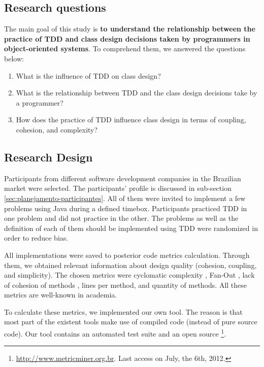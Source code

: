 \documentclass[conference]{IEEEtran}
\begin{document}
\subsection{Research questions}

The main goal of this study is \textbf{to understand the relationship between
the practice of TDD and class design decisions taken by programmers in object-oriented
systems}. To comprehend them, we answered the questions below:

\begin{enumerate}

	\item What is the influence of TDD on class design?

	\item What is the relationship between TDD and the class design decisions take
	by a programmer?

	\item How does the practice of TDD influence class design in terms of coupling, 
	cohesion, and complexity?

\end{enumerate}

\subsection{Research Design}

Participants from different software development companies in the Brazilian
market were selected. The participants' profile is discussed in sub-section
\ref{sec:planejamento-participantes}. All of them were invited to implement
a few problems using Java during a defined timebox. Participants practiced
TDD in one problem and did not practice in the other. The problems
as well as the definition of each of them should be implemented using TDD were
randomized in order to reduce bias.

All implementations were saved to posterior code metrics calculation.
Through them, we obtained relevant information about design quality (cohesion, 
coupling, and simplicity). The chosen metrics were cyclomatic complexity \cite{mccabe},
Fan-Out \cite{lorenz}, lack of cohesion of methods \cite{lcom-hs}, lines per method,
and quantity of methods. All these metrics are well-known in academia.

To calculate these metrics, we implemented our own tool. The reason is that
most part of the existent tools make use of compiled code (instead of pure source
code). Our tool contains an automated test suite and an open source
\footnote{\url{http://www.metricminer.org.br}. 
Last access on July, the 6th, 2012.}.
\end{document}

